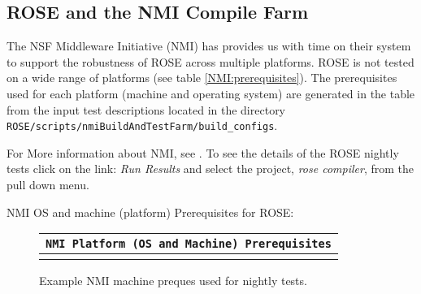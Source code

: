\subsection{ROSE and the NMI Compile Farm}
\label{NMI_testing}

   The NSF Middleware Initiative (NMI) has provides us with 
time on their system to support the robustness of ROSE across
multiple platforms.  ROSE is not tested on a wide range of platforms
(see table \ref{NMI:prerequisites}).  The prerequisites
used for each platform (machine and operating system) are generated
in the table from the input test descriptions located in the 
directory {\tt ROSE/scripts/nmiBuildAndTestFarm/build\_configs}.

For More information about NMI, see
.
To see the details of the ROSE nightly tests click on the link: {\em Run Results}
and select the project, {\em rose compiler}, from the pull down menu.


   NMI OS and machine (platform) Prerequisites for ROSE:
{\indent
\begin{latexonly}
\begin{figure}[tb]
\begin{center}
\begin{tabular}{|c|} \hline
     {\tt NMI Platform (OS and Machine) Prerequisites}
\\\hline\hline
{
\scriptsize
   
}
\\\hline
\end{tabular}
\end{center}
\caption{ Example NMI machine preques used for nightly tests. }
\end{figure}
\end{latexonly}
\label{NMI:prerequisites}
}

